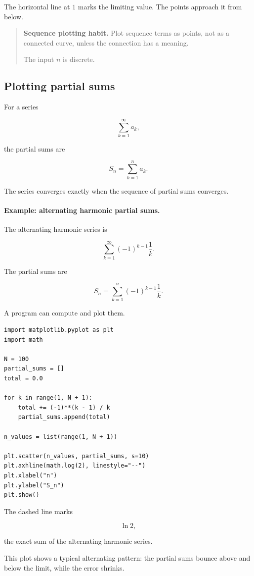 The horizontal line at \(1\) marks the limiting value.  The points approach it from
below.

\begin{quote}
\textbf{Sequence plotting habit.}
Plot sequence terms as points, not as a connected curve, unless the connection has a
meaning.

The input \(n\) is discrete.
\end{quote}

\subsection{Plotting partial sums}
\label{appsubsec:plotting-partial-sums}

For a series

\[
\sum_{k=1}^{\infty} a_k,
\]

the partial sums are

\[
S_n=\sum_{k=1}^{n}a_k.
\]

The series converges exactly when the sequence of partial sums converges.

\paragraph{Example: alternating harmonic partial sums.}
The alternating harmonic series is

\[
\sum_{k=1}^{\infty}(-1)^{k-1}\frac1k.
\]

The partial sums are

\[
S_n=\sum_{k=1}^{n}(-1)^{k-1}\frac1k.
\]

A program can compute and plot them.

\begin{verbatim}
import matplotlib.pyplot as plt
import math

N = 100
partial_sums = []
total = 0.0

for k in range(1, N + 1):
    total += (-1)**(k - 1) / k
    partial_sums.append(total)

n_values = list(range(1, N + 1))

plt.scatter(n_values, partial_sums, s=10)
plt.axhline(math.log(2), linestyle="--")
plt.xlabel("n")
plt.ylabel("S_n")
plt.show()
\end{verbatim}

The dashed line marks

\[
\ln2,
\]

the exact sum of the alternating harmonic series.

This plot shows a typical alternating pattern: the partial sums bounce above and below
the limit, while the error shrinks.

